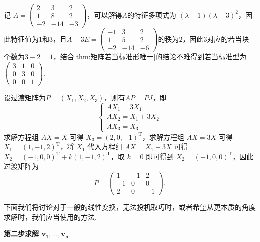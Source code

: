 \begin{solution}
    记 $A=\begin{pmatrix}
        2 & 3 & 2 \\ 1 & 8 & 2 \\ -2 & -14 & -3
    \end{pmatrix}$，可以解得$A$的特征多项式为 $(\lambda-1)(\lambda-3)^2$，因此特征值为$1$和$3$，且$A-3E=\begin{pmatrix}
        -1 & 3 & 2 \\ 1 & 5 & 2 \\ -2 & -14 & -6
    \end{pmatrix}$的秩为$2$，因此$3$对应的若当块个数为$3-2=1$，结合\autoref{thm:矩阵若当标准形唯一}的结论不难得到若当标准型为$\begin{pmatrix}
        3 & 1 & 0 \\ 0 & 3 & 0 \\ 0 & 0 & 1
    \end{pmatrix}$.

    设过渡矩阵为$P=(X_1, X_2, X_3)$，则有$AP=PJ$，即
    \[
        \begin{cases}
            AX_1=3X_1 \\ AX_2=X_1+3X_2 \\ AX_3=X_3
        \end{cases}
    \]
    求解方程组 $AX=X$ 可得 $X_3=(2,0,-1)^\mathrm{T}$，求解方程组 $AX=3X$ 可得 $X_1=(1,-1,2)^\mathrm{T}$，将 $X_1$ 代入方程组 $AX=X_1+3X$ 可得 $X_2=(-1,0,0)^\mathrm{T}+k(1,-1,2)^\mathrm{T}$，取 $k=0$ 即可得到 $X_2=(-1,0,0)^\mathrm{T}$，因此过渡矩阵为
    \[P=\begin{pmatrix}
        1 & -1 & 2 \\ -1 & 0 & 0 \\ 2 & 0 & -1
    \end{pmatrix}.\]
\end{solution}

下面我们将讨论对于一般的线性变换，无法投机取巧时，或者希望从更本质的角度求解时，我们应当使用的方法.

\begin{center}
    \textbf{\heiti 第二步\quad 求解 $\boldsymbol{v_1,\ldots,v_n}$}
\end{center}

